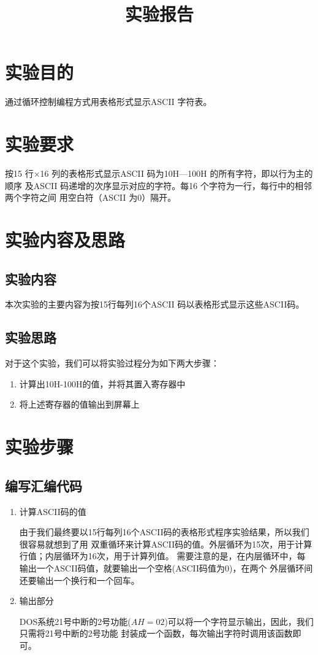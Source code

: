 \documentclass{shureport}
\title{实验报告}
\date{\zhtoday}
\begin{document}
\makecover



\section{实验目的}
通过循环控制编程方式用表格形式显示ASCII 字符表。
\section{实验要求}
按15 行×16 列的表格形式显示ASCII 码为10H—100H 的所有字符，即以行为主的顺序
及ASCII 码递增的次序显示对应的字符。每16 个字符为一行，每行中的相邻两个字符之间
用空白符（ASCII 为0）隔开。

\section{实验内容及思路}
    \subsection{实验内容}
    本次实验的主要内容为按15行每列16个ASCII 码以表格形式显示这些ASCII码。
    \subsection{实验思路}
    对于这个实验，我们可以将实验过程分为如下两大步骤：
        \begin{enumerate}
            \item 计算出10H-100H的值，并将其置入寄存器中
            \item 将上述寄存器的值输出到屏幕上 
        \end{enumerate}

\section{实验步骤}
        \subsection{编写汇编代码}
            \begin{enumerate}
                \item 计算ASCII码的值
                \par 由于我们最终要以15行每列16个ASCII码的表格形式程序实验结果，所以我们很容易就想到了用
                双重循环来计算ASCII码的值。外层循环为15次，用于计算行值；内层循环为16次，用于计算列值。
                需要注意的是，在内层循环中，每输出一个ASCII码值，就要输出一个空格(ASCII码值为0)，在两个
                外层循环间还要输出一个换行和一个回车。
                \item 输出部分
                \par DOS系统21号中断的2号功能($AH=02$)可以将一个字符显示输出，因此，我们只需将21号中断的2号功能
                封装成一个函数，每次输出字符时调用该函数即可。
            \end{enumerate}
\end{document}
